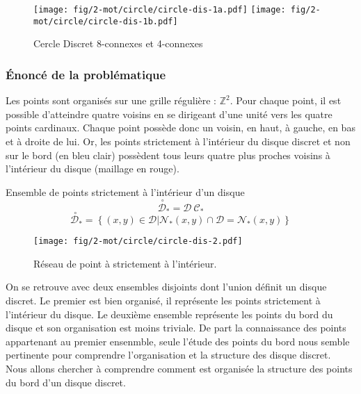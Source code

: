 \begin{figure}[H]
  \centering
  \texttt{[image: fig/2-mot/circle/circle-dis-1a.pdf]}
  \texttt{[image: fig/2-mot/circle/circle-dis-1b.pdf]}
  \caption{Cercle Discret 8-connexes et 4-connexes}
\end{figure}


\subsubsection{Énoncé de la problématique}

Les points sont organisés sur une grille régulière : $\mathbb{Z}^{2}$. Pour chaque point, il est possible d'atteindre quatre voisins en se dirigeant d'une unité vers les quatre points cardinaux. Chaque point possède donc un voisin, en haut, à gauche, en bas et à droite de lui. Or, les points strictement à l'intérieur du disque discret et non sur le bord (en bleu clair) possèdent tous leurs quatre plus proches voisins à l'intérieur du disque (maillage en rouge).

\begin{Definition}{Ensemble de points strictement à l'intérieur d'un disque}
\label{def:int-ens}
  $$\stackrel{\ \circ}{\mathcal{D}}_{*} = \mathcal{D} \ \mathcal{C_{*}} $$
  $$ \stackrel{\ \circ}{\mathcal{D}}_{*} =  \left\{ (x,y) \in \mathcal{D} | \mathcal{N}_{*}(x,y) \cap \mathcal{D} = \mathcal{N}_{*}(x,y) \right\}$$
\end{Definition}

\begin{figure}[H]
  \centering
  \texttt{[image: fig/2-mot/circle/circle-dis-2.pdf]}
  \caption{Réseau de point à strictement à l'intérieur.}
\end{figure}

On se retrouve avec deux ensembles disjoints dont l'union définit un disque discret. Le premier est bien organisé, il représente les points strictement à l'intérieur du disque. Le deuxième ensemble représente les points du bord du disque et son organisation est moins triviale. De part la connaissance des points appartenant au  premier ensenmble, seule l'étude des points du bord nous semble pertinente pour comprendre l'organisation et la structure des disque discret.\\

Nous allons chercher à comprendre comment est organisée la structure des points du bord d'un disque discret.


